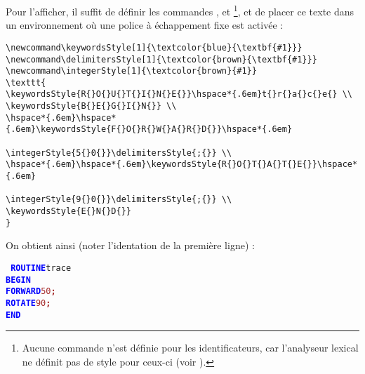 Pour l'afficher, il suffit de définir les commandes ,  et \footnote{Aucune commande n'est définie pour les identificateurs, car l'analyseur lexical ne définit pas de style pour ceux-ci (voir ).}, et de placer ce texte dans un environnement où une police à échappement fixe est activée :



{\small
\begin{verbatim}
\newcommand\keywordsStyle[1]{\textcolor{blue}{\textbf{#1}}}
\newcommand\delimitersStyle[1]{\textcolor{brown}{\textbf{#1}}}
\newcommand\integerStyle[1]{\textcolor{brown}{#1}}
\texttt{
\keywordsStyle{R{}O{}U{}T{}I{}N{}E{}}\hspace*{.6em}t{}r{}a{}c{}e{} \\
\keywordsStyle{B{}E{}G{}I{}N{}} \\
\hspace*{.6em}\hspace*{.6em}\keywordsStyle{F{}O{}R{}W{}A{}R{}D{}}\hspace*{.6em}
                                  \integerStyle{5{}0{}}\delimitersStyle{;{}} \\
\hspace*{.6em}\hspace*{.6em}\keywordsStyle{R{}O{}T{}A{}T{}E{}}\hspace*{.6em}
                                  \integerStyle{9{}0{}}\delimitersStyle{;{}} \\
\keywordsStyle{E{}N{}D{}}
}
\end{verbatim}
}

On obtient ainsi (noter l'identation de la première ligne) :

\texttt{
\textcolor{blue}{\bf ROUTINE}\hspace*{.6em}t{}r{}a{}c{}e{} \\
\textcolor{blue}{\bf BEGIN} \\
\hspace*{1.2em}\textcolor{blue}{\bf FORWARD}\hspace*{.6em}\textcolor{brown}{5{}0{}}\textcolor{brown}{\bf ;} \\
\hspace*{1.2em}\textcolor{blue}{\bf ROTATE}\hspace*{.6em}\textcolor{brown}{9{}0{}}\textcolor{brown}{\bf ;} \\
\textcolor{blue}{\bf END}
}


